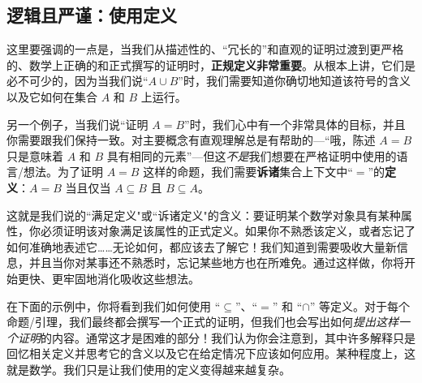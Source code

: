 \subsection{逻辑且严谨：使用定义}

这里要强调的一点是，当我们从描述性的、``冗长的''和直观的证明过渡到更严格的、数学上正确的和正式撰写的证明时，\textbf{正规定义非常重要}。从根本上讲，它们是必不可少的，因为当我们说``$A \cup B$''时，我们需要知道你确切地知道该符号的含义以及它如何在集合 $A$ 和 $B$ 上运行。

另一个例子，当我们说``证明 $A = B$''时，我们心中有一个非常具体的目标，并且你需要跟我们保持一致。对主要概念有直观理解总是有帮助的---``哦，陈述 $A = B$ 只是意味着 $A$ 和 $B$ 具有相同的元素''---但这\emph{不是}我们想要在严格证明中使用的语言/想法。为了证明 $A = B$ 这样的命题，我们需要\textbf{诉诸}集合上下文中``$=$''的\textbf{定义}：$A = B$ 当且仅当 $A \subseteq B$ 且 $B \subseteq A$。

这就是我们说的``满足定义"或``诉诸定义"的含义：要证明某个数学对象具有某种属性，你必须证明该对象满足该属性的正式定义。如果你不熟悉该定义，或者忘记了如何准确地表述它……无论如何，都应该去了解它！我们知道到需要吸收大量新信息，并且当你对某事还不熟悉时，忘记某些地方也在所难免。通过这样做，你将开始更快、更牢固地消化吸收这些想法。

在下面的示例中，你将看到我们如何使用 ``$\subseteq$''、``$=$'' 和 ``$\cap$'' 等定义。对于每个命题/引理，我们最终都会撰写一个正式的证明，但我们也会写出如何\emph{提出这样一个证明}的内容。通常这才是困难的部分！我们认为你会注意到，其中许多解释只是回忆相关定义并思考它的含义以及它在给定情况下应该如何应用。某种程度上，这就是数学。我们只是让我们使用的定义变得越来越复杂。
